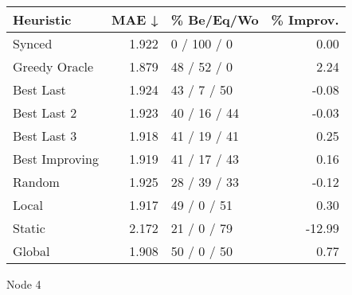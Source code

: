 \begin{tabular}{lrlr}
\toprule
\textbf{Heuristic} & \textbf{MAE ↓} & \textbf{\% Be/Eq/Wo} & \textbf{\% Improv.} \\
\midrule
            Synced &          1.922 &          0 / 100 / 0 &                0.00 \\
     Greedy Oracle &          1.879 &          48 / 52 / 0 &                2.24 \\
         Best Last &          1.924 &          43 / 7 / 50 &               -0.08 \\
       Best Last 2 &          1.923 &         40 / 16 / 44 &               -0.03 \\
       Best Last 3 &          1.918 &         41 / 19 / 41 &                0.25 \\
    Best Improving &          1.919 &         41 / 17 / 43 &                0.16 \\
            Random &          1.925 &         28 / 39 / 33 &               -0.12 \\
             Local &          1.917 &          49 / 0 / 51 &                0.30 \\
            Static &          2.172 &          21 / 0 / 79 &              -12.99 \\
            Global &          1.908 &          50 / 0 / 50 &                0.77 \\
\bottomrule
\end{tabular}
\caption{Node 4}
\label{tab:ds_iid_lr05_le1_bs4_4}
